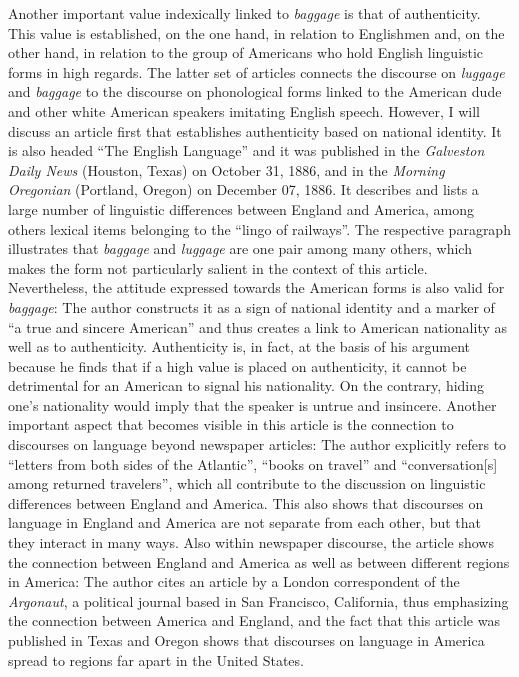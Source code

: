 Another important value indexically linked to \emph{baggage} is that of authenticity. This value is established, on the one hand, in relation to Englishmen and, on the other hand, in relation to the group of Americans who hold English linguistic forms in high regards. The latter set of articles connects the discourse on \emph{luggage} and \emph{baggage} to the discourse on phonological forms linked to the American dude and other white American speakers imitating English speech. However, I will discuss an article first that establishes authenticity based on national identity. It is also headed “The English Language” and it was published in the \emph{Galveston Daily News} (Houston, Texas) on October 31, 1886, and in the \emph{Morning Oregonian} (Portland, Oregon) on December 07, 1886. It describes and lists a large number of linguistic differences between England and America, among others lexical items belonging to the “lingo of railways”. The respective paragraph illustrates that \emph{baggage} and \emph{luggage} are one pair among many others, which makes the form not particularly salient in the context of this article. Nevertheless, the attitude expressed towards the American forms is also valid for \emph{baggage}: The author constructs it as a sign of national identity and a marker of “a true and sincere American” and thus creates a link to American nationality as well as to authenticity. Authenticity is, in fact, at the basis of his argument because he finds that if a high value is placed on authenticity, it cannot be detrimental for an American to signal his nationality. On the contrary, hiding one’s nationality would imply that the speaker is untrue and insincere. Another important aspect that becomes visible in this article is the connection to discourses on language beyond newspaper articles: The author explicitly refers to “letters from both sides of the Atlantic”, “books on travel” and “conversation[s] among returned travelers”, which all contribute to the discussion on linguistic differences between England and America. This also shows that discourses on language in England and America are not separate from each other, but that they interact in many ways. Also within newspaper discourse, the article shows the connection between England and America as well as between different regions in America: The author cites an article by a London correspondent of the \emph{Argonaut}, a political journal based in San Francisco, California, thus emphasizing the connection between America and England, and the fact that this article was published in Texas and Oregon shows that discourses on language in America spread to regions far apart in the United States.

